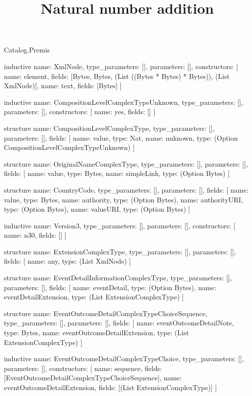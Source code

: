 \begin{lexlean}{Catalog.Premis}
\title{Natural number addition}
\begin{semanticmodule}
inductive{
  name: XmlNode,
  type_parameters: [],
  parameters: [],
  constructors: [
    {name: element, fields: [Bytes, Bytes, (List ((Bytes * Bytes) * Bytes)), (List XmlNode)]},
    {name: text, fields: [Bytes]}
  ]
}

inductive{
  name: CompositionLevelComplexTypeUnknown,
  type_parameters: [],
  parameters: [],
  constructors: [
    {name: yes, fields: []}
  ]
}

structure{
  name: CompositionLevelComplexType,
  type_parameters: [],
  parameters: [],
  fields: [
    {name: value, type: Nat},
    {name: unknown, type: (Option CompositionLevelComplexTypeUnknown)}
  ]
}

structure{
  name: OriginalNameComplexType,
  type_parameters: [],
  parameters: [],
  fields: [
    {name: value, type: Bytes},
    {name: simpleLink, type: (Option Bytes)}
  ]
}

structure{
  name: CountryCode,
  type_parameters: [],
  parameters: [],
  fields: [
    {name: value, type: Bytes},
    {name: authority, type: (Option Bytes)},
    {name: authorityURI, type: (Option Bytes)},
    {name: valueURI, type: (Option Bytes)}
  ]
}

inductive{
  name: Version3,
  type_parameters: [],
  parameters: [],
  constructors: [
    {name: n30, fields: []}
  ]
}

structure{
  name: ExtensionComplexType,
  type_parameters: [],
  parameters: [],
  fields: [
    {name: any, type: (List XmlNode)}
  ]
}

structure{
  name: EventDetailInformationComplexType,
  type_parameters: [],
  parameters: [],
  fields: [
    {name: eventDetail, type: (Option Bytes)},
    {name: eventDetailExtension, type: (List ExtensionComplexType)}
  ]
}

structure{
  name: EventOutcomeDetailComplexTypeChoiceSequence,
  type_parameters: [],
  parameters: [],
  fields: [
    {name: eventOutcomeDetailNote, type: Bytes},
    {name: eventOutcomeDetailExtension, type: (List ExtensionComplexType)}
  ]
}

inductive{
  name: EventOutcomeDetailComplexTypeChoice,
  type_parameters: [],
  parameters: [],
  constructors: [
    {name: sequence, fields: [EventOutcomeDetailComplexTypeChoiceSequence]},
    {name: eventOutcomeDetailExtension, fields: [(List ExtensionComplexType)]}
  ]
}


\end{semanticmodule}
\end{lexlean}
